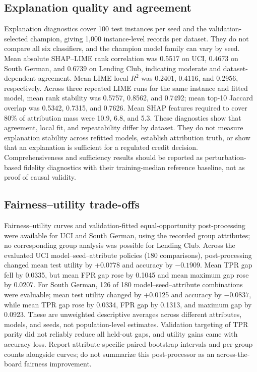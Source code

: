 \documentclass[pdflatex,sn-mathphys-num]{sn-jnl}
\begin{document}
\subsection{Explanation quality and agreement}
Explanation diagnostics cover 100 test instances per seed and the validation-selected champion, giving 1,000 instance-level records per dataset. They do not compare all six classifiers, and the champion model family can vary by seed. Mean absolute SHAP--LIME rank correlation was 0.5517 on UCI, 0.4673 on South German, and 0.6739 on Lending Club, indicating moderate and dataset-dependent agreement. Mean LIME local $R^2$ was 0.2401, 0.4116, and 0.2956, respectively. Across three repeated LIME runs for the same instance and fitted model, mean rank stability was 0.5757, 0.8562, and 0.7492; mean top-10 Jaccard overlap was 0.5342, 0.7315, and 0.7626. Mean SHAP features required to cover 80\% of attribution mass were 10.9, 6.8, and 5.3. These diagnostics show that agreement, local fit, and repeatability differ by dataset. They do not measure explanation stability across refitted models, establish attribution truth, or show that an explanation is sufficient for a regulated credit decision. Comprehensiveness and sufficiency results should be reported as perturbation-based fidelity diagnostics with their training-median reference baseline, not as proof of causal validity.

\subsection{Fairness--utility trade-offs}
Fairness--utility curves and validation-fitted equal-opportunity post-processing were available for UCI and South German, using the recorded group attributes; no corresponding group analysis was possible for Lending Club. Across the evaluated UCI model--seed--attribute policies (180 comparisons), post-processing changed mean test utility by +0.0778 and accuracy by $-0.1909$. Mean TPR gap fell by 0.0335, but mean FPR gap rose by 0.1045 and mean maximum gap rose by 0.0207. For South German, 126 of 180 model--seed--attribute combinations were evaluable; mean test utility changed by +0.0125 and accuracy by $-0.0837$, while mean TPR gap rose by 0.0334, FPR gap by 0.1313, and maximum gap by 0.0923. These are unweighted descriptive averages across different attributes, models, and seeds, not population-level estimates. Validation targeting of TPR parity did not reliably reduce all held-out gaps, and utility gains came with accuracy loss. Report attribute-specific paired bootstrap intervals and per-group counts alongside curves; do not summarize this post-processor as an across-the-board fairness improvement.
\end{document}
